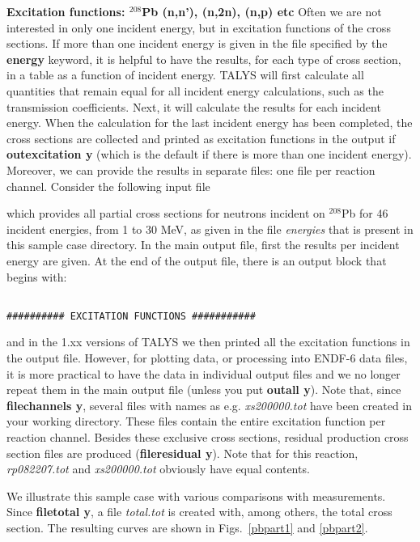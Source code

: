 \begin{samplecase}
{\bf Excitation functions: ${}^{208}$Pb (n,n'), (n,2n), (n,p) etc}\newline
Often we are not interested in only one incident energy, but in excitation 
functions of the cross sections.
If more than one incident energy is given in the file specified by the 
{\bf energy} keyword, it is helpful to have the results, for each type of cross 
section, in a table as a function of incident energy. TALYS will first 
calculate 
all quantities that remain equal for all incident energy calculations, such as 
the transmission coefficients. Next, it will calculate the results for each 
incident energy. When the calculation for 
the last incident energy has been completed, the cross sections are 
collected 
and printed as excitation functions in the output if {\bf outexcitation y} 
(which is the default if there is more than one incident energy).
Moreover, we can provide
the results in separate files: one file per reaction channel.
Consider the following input file
 

which provides all partial cross sections for neutrons incident on ${}^{208}$Pb
for 46 incident energies, from 1 to 30 MeV, as given in the file 
{\em energies} that is present in this sample case directory.
In the main output file, first the results per incident energy are given.
At the end of the output file, there is an output block that begins with:  

{\small \begin{verbatim}

########## EXCITATION FUNCTIONS ###########
\end{verbatim} } \renewcommand{\baselinestretch}{1.07}\small\normalsize
\noindent

and in the 1.xx versions of TALYS we then printed all the excitation functions in the output file.
However, for plotting data, or processing into ENDF-6 data files, it is more practical
to have the data in individual output files and we no longer repeat them in the main output file (unless you put {\bf outall y}). 
Note that, since 
{\bf filechannels y}, several files with names as e.g. {\em xs200000.tot} have 
been created in your working directory. These files contain the entire
excitation function per reaction channel.
Besides these 
exclusive cross sections, residual production cross section files are produced
({\bf fileresidual y}).
Note that for this reaction, {\em rp082207.tot} and {\em xs200000.tot} 
obviously have equal contents. 

We illustrate this sample case with various comparisons with measurements. Since
{\bf filetotal y}, a file {\em total.tot} is created with, among others, the 
total cross section. The resulting curves are shown in Figs.~\ref{pbpart1} and 
\ref{pbpart2}.
\end{samplecase}

